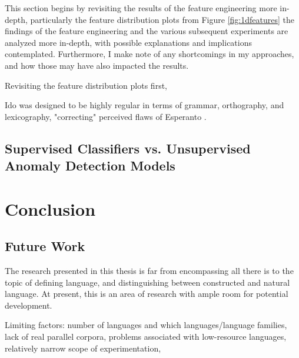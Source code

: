 \documentclass[12pt,a4paper]{article}
\numberwithin{figure}{section}
\numberwithin{table}{section}
\numberwithin{definition}{section}
\begin{document}
This section begins by revisiting the results of the feature engineering more in-depth, particularly the feature distribution plots from Figure \ref{fig:1dfeatures} the findings of the feature engineering and the various subsequent experiments are analyzed more in-depth, with possible explanations and implications contemplated. Furthermore, I make note of any shortcomings in my approaches, and how those may have also impacted the results.

Revisiting the feature distribution plots first, 

Ido was designed to be highly regular in terms of grammar, orthography, and lexicography, "correcting" perceived flaws of Esperanto \parencite{Novikov2022article}.

\subsection{Supervised Classifiers vs. Unsupervised Anomaly Detection Models}
\label{ssec:supervisedvsunsupervised}




\newpage
\section{Conclusion}
\label{sec:conclusion}



\subsection{Future Work}
\label{ssec:futurework}

The research presented in this thesis is far from encompassing all there is to the topic of defining language, and distinguishing between constructed and natural language. At present, this is an area of research with ample room for potential development. 

Limiting factors: number of languages and which languages/language families, lack of real parallel corpora, problems associated with low-resource languages, relatively narrow scope of experimentation,
\end{document}
